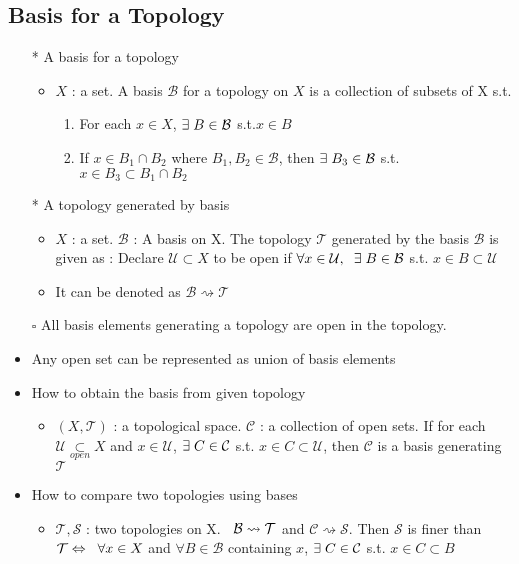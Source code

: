 \documentclass[12pt]{article}
\newcommand{\sq}{$\square$}
\newcommand{\sptwo}{\hspace{0.2cm}}
\newcommand{\spone}{\hspace{0.1cm}}
\newcommand{\open}{\underset{open}{\subset}}
\begin{document}
\subsection{Basis for a Topology}
\smallskip
\begin{itemize}
	\item [*] A basis for a topology
	\begin{itemize}
		\item $X$ : a set. A basis $\mathcal{B}$ for a topology on $X$ is a collection of subsets of X s.t.
		\begin{enumerate}
			\item For each $x\in X$, $\exists \spone B\in \mathcal{B}$ s.t.$x\in B$
			\item If $x\in B_1\cap B_2$ where $B_1, B_2\in \mathcal{B}$, then $\exists \spone B_3\in\mathcal{B}$ s.t. $x\in B_3\subset B_1\cap B_2$
		\end{enumerate}
	\end{itemize}
	\item[*] A topology generated by basis
	\begin{itemize}
		\item $X$ : a set. $\mathcal{B}$ : A basis on X. The topology $\mathcal{T}$ generated by the basis $\mathcal{B}$ is given as :\quad
		Declare $\mathcal{U}\subset X$ to be open if $\forall x\in \mathcal{U}, \sptwo \exists \spone B\in \mathcal{B}$ s.t. $x\in B\subset \mathcal{U}$
		\item It can be denoted as $\mathcal{B}\rightsquigarrow\mathcal{T}$
	\end{itemize}
	\item[\sq] All basis elements generating a topology are open in the topology.
	\item Any open set can be represented as union of basis elements
	\item How to obtain the basis from given topology
	\begin{itemize}
		\item $(X, \mathcal{T})$ : a topological space. $\mathcal{C}$ : a collection of open sets. \sptwo If for each $\mathcal{U}\open X$ and $x\in \mathcal{U}$, $\exists \spone C\in \mathcal{C}$ s.t. $x\in C \subset\mathcal{U}$, then $\mathcal{C}$ is a basis generating $\mathcal{T}$
	\end{itemize}
	\item How to compare two topologies using bases
	\begin{itemize}
		\item $\mathcal{T}, \mathcal{S}$ : two topologies on X. $\sptwo \mathcal{B}\rightsquigarrow \mathcal{T}$ and $\mathcal{C} \rightsquigarrow \mathcal{S}$.  Then $\mathcal{S}$ is finer than $\mathcal{T}\newline \Leftrightarrow \sptwo \forall x\in X$ and $\forall B\in \mathcal{B}$ containing $x$, $\exists \spone C\in \mathcal{C}$ s.t. $x\in C\subset B$

\end{itemize}
\end{itemize}
\end{document}
